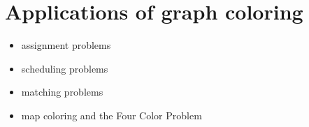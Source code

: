 
\section{Applications of graph coloring}

\begin{itemize}
\item assignment problems

\item scheduling problems

\item matching problems

\item map coloring and the Four Color Problem
\end{itemize}
